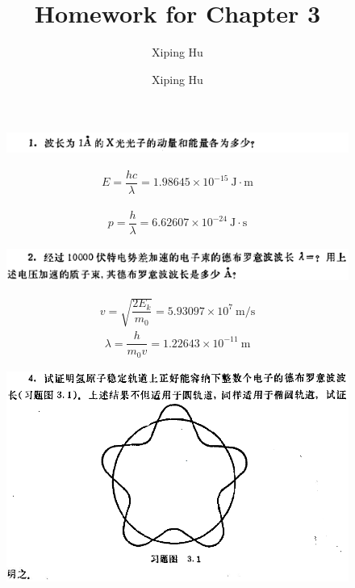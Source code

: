 \documentclass{article}
\author{Xiping Hu}
\author{Xiping Hu}
\affil{https://hxp.plus/}
\title{Homework for Chapter 3}
\begin{document}
\maketitle

\begin{figure}[H]
  \centering
  \includegraphics[width=\linewidth]{figures/1}
  \label{fig:}
\end{figure}

\begin{equation*}
  \begin{aligned}
    E= \dfrac{hc}{\lambda}  = 1.98645 \times 10^{-15} \  \mathrm{J \cdot m}
  \end{aligned}
\end{equation*}

\begin{equation*}
  \begin{aligned}
    p = \dfrac{h}{\lambda} =  6.62607 \times 10^{-24} \ \mathrm{J \cdot s}
  \end{aligned}
\end{equation*}

\begin{figure}[H]
  \centering
  \includegraphics[width=\linewidth]{figures/2}
  \label{fig:}
\end{figure}

\begin{equation*}
  \begin{aligned}
    v = \sqrt{\dfrac{2 E_k}{m_0} } = 5.93097 \times 10^7 \  \mathrm{m/s}
  \end{aligned}
\end{equation*}
\begin{equation*}
  \begin{aligned}
    \lambda = \dfrac{h}{m_0 v} = 1.22643 \times 10^{-11} \  \mathrm{m} 
  \end{aligned}
\end{equation*}

\begin{figure}[H]
  \centering
  \includegraphics[width=\linewidth]{figures/4}
  \label{fig:}
\end{figure}
\end{document}
